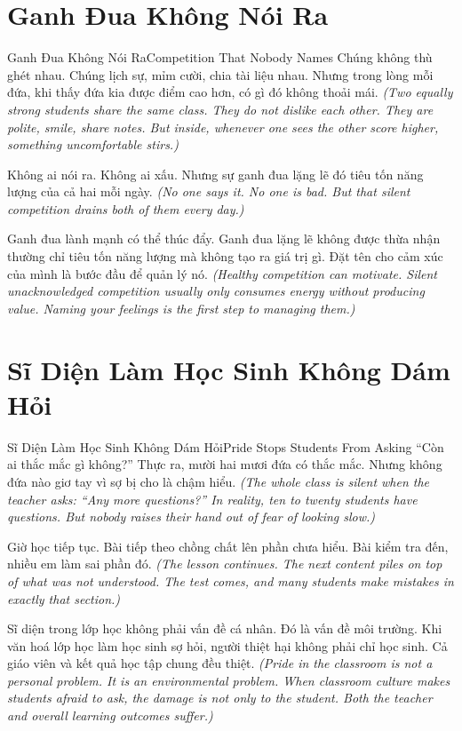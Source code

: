 \section{Ganh Đua Không Nói Ra}
\begin{truyen}{Ganh Đua Không Nói Ra}{Competition That Nobody Names}
 Chúng không thù ghét nhau. Chúng lịch sự, mỉm cười, chia tài liệu nhau. Nhưng trong lòng mỗi đứa, khi thấy đứa kia được điểm cao hơn, có gì đó không thoải mái.
\textit{(Two equally strong students share the same class. They do not dislike each other. They are polite, smile, share notes. But inside, whenever one sees the other score higher, something uncomfortable stirs.)}

Không ai nói ra. Không ai xấu. Nhưng sự ganh đua lặng lẽ đó tiêu tốn năng lượng của cả hai mỗi ngày.
\textit{(No one says it. No one is bad. But that silent competition drains both of them every day.)}

\begin{baihoc}
Ganh đua lành mạnh có thể thúc đẩy. Ganh đua lặng lẽ không được thừa nhận thường chỉ tiêu tốn năng lượng mà không tạo ra giá trị gì. Đặt tên cho cảm xúc của mình là bước đầu để quản lý nó.
\textit{(Healthy competition can motivate. Silent unacknowledged competition usually only consumes energy without producing value. Naming your feelings is the first step to managing them.)}
\end{baihoc}
\end{truyen}

\section{Sĩ Diện Làm Học Sinh Không Dám Hỏi}
\begin{truyen}{Sĩ Diện Làm Học Sinh Không Dám Hỏi}{Pride Stops Students From Asking}
 ``Còn ai thắc mắc gì không?'' Thực ra, mười hai mươi đứa có thắc mắc. Nhưng không đứa nào giơ tay vì sợ bị cho là chậm hiểu.
\textit{(The whole class is silent when the teacher asks: ``Any more questions?'' In reality, ten to twenty students have questions. But nobody raises their hand out of fear of looking slow.)}

Giờ học tiếp tục. Bài tiếp theo chồng chất lên phần chưa hiểu. Bài kiểm tra đến, nhiều em làm sai phần đó.
\textit{(The lesson continues. The next content piles on top of what was not understood. The test comes, and many students make mistakes in exactly that section.)}

\begin{baihoc}
Sĩ diện trong lớp học không phải vấn đề cá nhân. Đó là vấn đề môi trường. Khi văn hoá lớp học làm học sinh sợ hỏi, người thiệt hại không phải chỉ học sinh. Cả giáo viên và kết quả học tập chung đều thiệt.
\textit{(Pride in the classroom is not a personal problem. It is an environmental problem. When classroom culture makes students afraid to ask, the damage is not only to the student. Both the teacher and overall learning outcomes suffer.)}
\end{baihoc}
\end{truyen}

